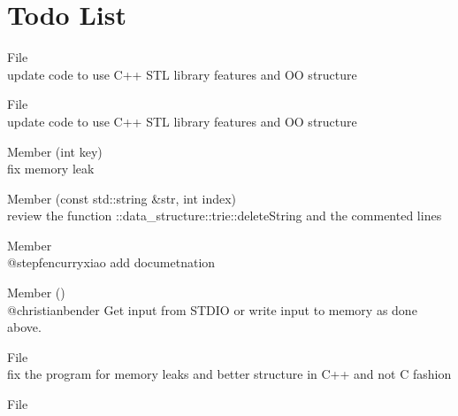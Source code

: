 \chapter{Todo List}
\hypertarget{todo}{}\label{todo}

\begin{DoxyRefList}
\item[File \doxylink{avltree_8cpp}{avltree.cpp} ]\hfill \\
\label{todo__todo000002}%
%
update code to use C++ STL library features and OO structure  
\item[File \doxylink{binary__search__tree_8cpp}{binary\+\_\+search\+\_\+tree.cpp} ]\hfill \\
\label{todo__todo000003}%
%
update code to use C++ STL library features and OO structure  
\item[Member \doxylink{hash__search_8cpp_ad0831425f1389166a9518f422d0c6ec5}{create\+\_\+list} (int key)]\hfill \\
\label{todo__todo000013}%
%
fix memory leak  
\item[Member \doxylink{classdata__structures_1_1trie_aeac27cfd397d2dd3f2f519efffafeeab}{data\+\_\+structures\+::trie\+::delete\+String} (const std\+::string \&str, int index)]\hfill \\
\label{todo__todo000005}%
%
review the function \+::data\+\_\+structure\+::trie\+::delete\+String and the commented lines  
\item[Member \doxylink{matrix__exponentiation_8cpp_a35b7c98af53ad2ec18658679ad7d43de}{fib\+\_\+b} ]\hfill \\
\label{todo__todo000008}%
%
@stepfencurryxiao add documetnation  
\item[Member \doxylink{ternary__search_8cpp_a7f7d866eccdabe51bb16818a792618b1}{get\+\_\+input} ()]\hfill \\
\label{todo__todo000014}%
%
@christianbender Get input from STDIO or write input to memory as done above.  
\item[File \doxylink{hash__search_8cpp}{hash\+\_\+search.cpp} ]\hfill \\
\label{todo__todo000012}%
%
fix the program for memory leaks and better structure in C++ and not C fashion  
\item[File \doxylink{heavy__light__decomposition_8cpp}{heavy\+\_\+light\+\_\+decomposition.cpp} ]\hfill \\

\end{DoxyRefList}

